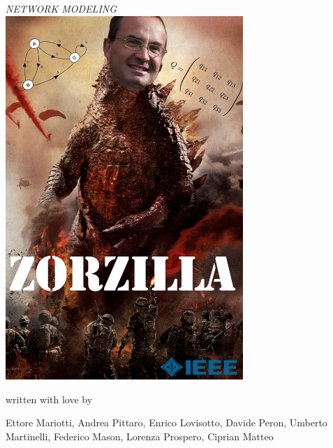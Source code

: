 \documentclass[a4paper, 12pt, twoside, openright,fleqn]{book}
\begin{document}
\frontmatter
 
\begin{titlepage} %
\begin{center}


\hspace{0.5cm}

\emph{\Large{NETWORK MODELING}} \\
\vspace{1cm}
\includegraphics[width=9cm]{Zorzilla}\\
\vspace{0.5cm}
{written with love by\par}
{\Large Ettore Mariotti, Andrea Pittaro, Enrico Lovisotto, Davide Peron, Umberto Martinelli, Federico Mason, Lorenza Prospero, Ciprian Matteo\par}
\end{center}



\end{titlepage}
\end{document}
